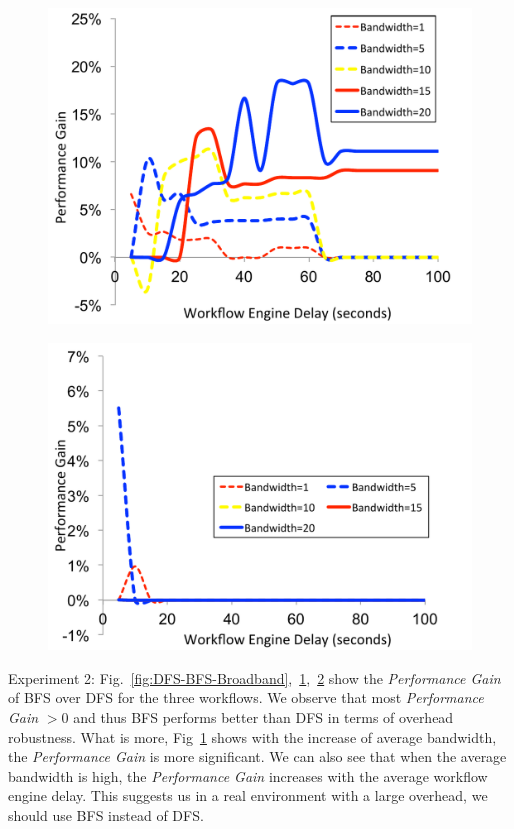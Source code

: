 \documentclass[final]{IEEEtran}
\begin{document}
\begin{figure}[!htb]
\centering
 \includegraphics[width=0.9\linewidth]{figure/DFS-BFS-CyberShake.pdf}
  \label{fig:DFS-BFS-CyberShake}
  \vspace{-10pt}
\end{figure}

\begin{figure}[!htb]
\centering
 \includegraphics[width=0.9\linewidth]{figure/DFS-BFS-Montage.pdf}
  \label{fig:DFS-BFS-Montage}
  \vspace{-10pt}
\end{figure}


Experiment 2: Fig.~\ref{fig:DFS-BFS-Broadband},~\ref{fig:DFS-BFS-CyberShake},~\ref{fig:DFS-BFS-Montage} show the \emph{Performance Gain} of BFS over DFS for the three workflows. We observe that most  \emph{Performance Gain} $>0$ and thus BFS performs better than DFS in terms of overhead robustness. What is more, Fig~\ref{fig:DFS-BFS-CyberShake} shows with the increase of average bandwidth, the \emph{Performance Gain} is more significant. We can also see that when the average bandwidth is high, the \emph{Performance Gain} increases with the average workflow engine delay. This suggests us in a real environment with a large overhead, we should use BFS instead of DFS. 
\end{document}
